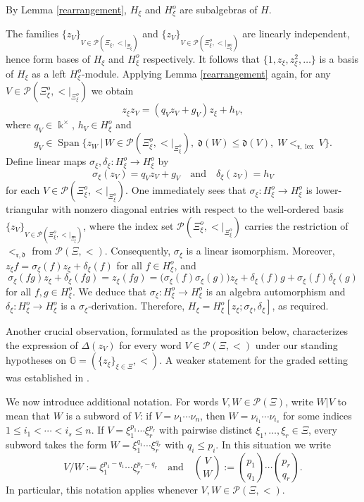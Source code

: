 \documentclass{article}
\makeatletter
\renewenvironment{proof}[1][\proofname]{\par
	\pushQED{\qed}%
	\normalfont \topsep6\p@\@plus6\p@\relax
	\trivlist
	\item[\hskip\labelsep
	\bfseries
	#1\@addpunct{.}]\ignorespaces
}{%
	\popQED\endtrivlist\@endpefalse
}
\theoremstyle{plain}
\theoremstyle{definition}
\numberwithin{equation}{section}
\DeclareMathOperator{\Span}{Span}
\DeclareMathOperator{\lex}{lex}
\newcommand{\PP}{\mathcal{P}}
\newcommand{\GG}{\mathbb{G}}
\newcommand{\dd}{\mathfrak{d}}
\newcommand{\rr}{\mathfrak{r}}
\makeatother
\begin{document}
	\begin{proof}[Proof of Proposition \ref{PBW-imply-IOE}]
		By Lemma \ref{rearrangement}, $H_{\xi}$ and $H_{\xi}^{o}$ are subalgebras of $H$.
		
		The families $\{z_{V}\}_{V\in \PP(\Xi_{\xi}, {<}|_{\Xi_{\xi}})}$ and $\{z_{V}\}_{V\in \PP(\Xi_{\xi}^{o}, {<}|_{\Xi_{\xi}^{o}})}$ are linearly independent, hence form bases of $H_{\xi}$ and $H_{\xi}^{o}$ respectively. It follows that $\{1, z_{\xi}, z_{\xi}^{2}, \ldots\}$ is a basis of $H_{\xi}$ as a left $H_{\xi}^{o}$-module. Applying Lemma \ref{rearrangement} again, for any $V\in \PP(\Xi_{\xi}^{o}, {<}|_{\Xi_{\xi}^{o}})$ we obtain
		\[z_{\xi}z_{V} =(q_{V}z_{V}+g_{V})z_{\xi} + h_{V},\]
		where $q_{V}\in \Bbbk^{\times}$, $h_{V} \in H_{\xi}^{o}$ and
		\[g_{V} \in \Span\big\{z_{W}\,\big|\, W\in \PP(\Xi_{\xi}^{o}, {<}|_{\Xi_{\xi}^{o}}),\; \dd(W)\leq \dd(V),\; W<_{\rr,\lex} V\big\}.\]
		Define linear maps $\sigma_{\xi}, \delta_{\xi}\colon H_{\xi}^{o} \to H_{\xi}^{o}$ by
		\[
		\sigma_{\xi}(z_{V}) = q_{V}z_{V}+g_{V} \quad \text{and} \quad  \delta_{\xi}(z_{V}) =h_{V}
		\]
		for each $V\in \PP(\Xi_{\xi}^{o}, {<}|_{\Xi_{\xi}^{o}})$. One immediately sees that $\sigma_{\xi}\colon H_{\xi}^{o}\to H_{\xi}^{o}$ is lower-triangular with nonzero diagonal entries with respect to the well-ordered basis $\{z_{V}\}_{V\in \PP(\Xi_{\xi}^{o}, {<}|_{\Xi_{\xi}^{o}})}$, where the index set $\PP(\Xi_{\xi}^{o}, {<}|_{\Xi_{\xi}^{o}})$ carries the restriction of $<_{\rr,\dd}$ from $\PP(\Xi, <)$. Consequently, $\sigma_{\xi}$ is a linear isomorphism. Moreover, $z_{\xi}f = \sigma_{\xi}(f) z_{\xi} + \delta_{\xi}(f)$ for all $f\in H_{\xi}^{o}$, and
		\[
		\sigma_{\xi}(fg) z_{\xi} +\delta_{\xi}(fg) = z_{\xi}(fg) = \big(\sigma_{\xi}(f)\sigma_{\xi}(g)\big) z_{\xi} + \delta_{\xi}(f) g + \sigma_{\xi}(f)\delta_{\xi}(g)
		\]
		for all $f,g\in H_{\xi}^{o}$.
		We deduce that $\sigma_{\xi}\colon H_{\xi}^{o}\to H_{\xi}^{o}$ is an algebra automorphism and $\delta_{\xi}\colon H_{\xi}^{o}\to H_{\xi}^{o}$ is a $\sigma_{\xi}$-derivation. Therefore, $H_{\xi} = H_{\xi}^{o}[z_{\xi};\sigma_{\xi},\delta_{\xi}]$, as required.
	\end{proof}
	
	Another crucial observation, formulated as the proposition below, characterizes the expression of $\Delta(z_{V})$ for every word $V\in \PP(\Xi, <)$ under  our standing hypotheses on $\GG=(\{z_\xi\}_{\xi\in\Xi},<)$. A weaker statement for the graded setting was established in \cite[Lemma 3.3]{LZ25}.
	
	We now introduce additional notation. For words $V, W\in \PP(\Xi)$, write $W| V$ to mean that $W$ is a subword of $V$: if $V=\nu_1\cdots \nu_n$, then $W=\nu_{i_1}\cdots \nu_{i_s}$ for some indices $1\leq i_1<\cdots <i_s\leq n$. If $V= \xi_{1}^{p_{1}} \cdots \xi_{r}^{p_{r}}$ with pairwise distinct $\xi_1,\ldots, \xi_r \in \Xi$, every subword takes the form $W= \xi_{1}^{q_{1}} \cdots \xi_{r}^{q_{r}}$ with $q_i\leq p_i$. In this situation we write
	\[
	V/W:= \xi_{1}^{p_{1}-q_{1}} \cdots \xi_{r}^{p_{r} -q_{r}} \quad \text{and} \quad \binom{V}{W}:= \binom{p_1}{q_1}\cdots \binom{p_r}{q_r}.
	\]
	In particular, this notation applies whenever $V,W\in \PP(\Xi, <)$.
	
\end{document}
